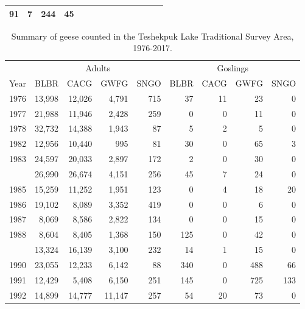 \documentclass[]{article}
\begin{document}
{\begin{longtable}[]{@{}rrrrrrrrrrrrrr@{}}
\begin{minipage}[t]{0.04\columnwidth}
91\strut
\end{minipage} & \begin{minipage}[t]{0.04\columnwidth}\raggedleft\strut
7\strut
\end{minipage} & \begin{minipage}[t]{0.04\columnwidth}\raggedleft\strut
244\strut
\end{minipage} & \begin{minipage}[t]{0.04\columnwidth}\raggedleft\strut
45\strut
\end{minipage}\tabularnewline
\bottomrule
\end{longtable}
}%
\begin{table}

\caption{\label{tab:Kable_76_17}Summary of geese counted in the Teshekpuk Lake Traditional Survey Area, 1976-2017.}
\centering
\begin{tabular}[t]{lrrrrrrrr}
\toprule
\multicolumn{1}{c}{} & \multicolumn{4}{c}{Adults} & \multicolumn{4}{c}{Goslings} \\
\cmidrule(l{2pt}r{2pt}){2-5} \cmidrule(l{2pt}r{2pt}){6-9}
Year & BLBR & CACG & GWFG & SNGO & BLBR & CACG & GWFG & SNGO\\
\midrule
1976 & 13,998 & 12,026 & 4,791 & 715 & 37 & 11 & 23 & 0\\
1977 & 21,988 & 11,946 & 2,428 & 259 & 0 & 0 & 11 & 0\\
1978 & 32,732 & 14,388 & 1,943 & 87 & 5 & 2 & 5 & 0\\
1982 & 12,956 & 10,440 & 995 & 81 & 30 & 0 & 65 & 3\\
1983 & 24,597 & 20,033 & 2,897 & 172 & 2 & 0 & 30 & 0\\
\addlinespace
1984 & 26,990 & 26,674 & 4,151 & 256 & 45 & 7 & 24 & 0\\
1985 & 15,259 & 11,252 & 1,951 & 123 & 0 & 4 & 18 & 20\\
1986 & 19,102 & 8,089 & 3,352 & 419 & 0 & 0 & 6 & 0\\
1987 & 8,069 & 8,586 & 2,822 & 134 & 0 & 0 & 15 & 0\\
1988 & 8,604 & 8,405 & 1,368 & 150 & 125 & 0 & 42 & 0\\
\addlinespace
1989 & 13,324 & 16,139 & 3,100 & 232 & 14 & 1 & 15 & 0\\
1990 & 23,055 & 12,233 & 6,142 & 88 & 340 & 0 & 488 & 66\\
1991 & 12,429 & 5,408 & 6,150 & 251 & 145 & 0 & 725 & 133\\
1992 & 14,899 & 14,777 & 11,147 & 257 & 54 & 20 & 73 & 0\\

\end{tabular}
\end{table}
\end{document}
